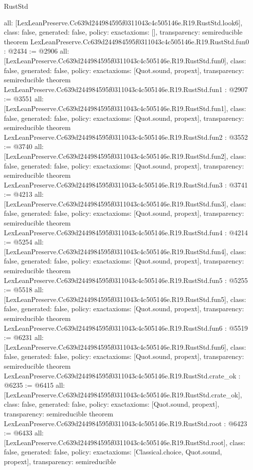 \begin{lexlean}{RustStd}
\begin{coremodule}
{  all: [LexLeanPreserve.Cc639d244984595f0311043c4c505146e.R19.RustStd.look6],
  class: false,
  generated: false,
  policy: exact{axioms: []},
  transparency: semireducible
}
theorem LexLeanPreserve.Cc639d244984595f0311043c4c505146e.R19.RustStd.fun0 : @2434 := @2906 {
  all: [LexLeanPreserve.Cc639d244984595f0311043c4c505146e.R19.RustStd.fun0],
  class: false,
  generated: false,
  policy: exact{axioms: [Quot.sound, propext]},
  transparency: semireducible
}
theorem LexLeanPreserve.Cc639d244984595f0311043c4c505146e.R19.RustStd.fun1 : @2907 := @3551 {
  all: [LexLeanPreserve.Cc639d244984595f0311043c4c505146e.R19.RustStd.fun1],
  class: false,
  generated: false,
  policy: exact{axioms: [Quot.sound, propext]},
  transparency: semireducible
}
theorem LexLeanPreserve.Cc639d244984595f0311043c4c505146e.R19.RustStd.fun2 : @3552 := @3740 {
  all: [LexLeanPreserve.Cc639d244984595f0311043c4c505146e.R19.RustStd.fun2],
  class: false,
  generated: false,
  policy: exact{axioms: [Quot.sound, propext]},
  transparency: semireducible
}
theorem LexLeanPreserve.Cc639d244984595f0311043c4c505146e.R19.RustStd.fun3 : @3741 := @4213 {
  all: [LexLeanPreserve.Cc639d244984595f0311043c4c505146e.R19.RustStd.fun3],
  class: false,
  generated: false,
  policy: exact{axioms: [Quot.sound, propext]},
  transparency: semireducible
}
theorem LexLeanPreserve.Cc639d244984595f0311043c4c505146e.R19.RustStd.fun4 : @4214 := @5254 {
  all: [LexLeanPreserve.Cc639d244984595f0311043c4c505146e.R19.RustStd.fun4],
  class: false,
  generated: false,
  policy: exact{axioms: [Quot.sound, propext]},
  transparency: semireducible
}
theorem LexLeanPreserve.Cc639d244984595f0311043c4c505146e.R19.RustStd.fun5 : @5255 := @5518 {
  all: [LexLeanPreserve.Cc639d244984595f0311043c4c505146e.R19.RustStd.fun5],
  class: false,
  generated: false,
  policy: exact{axioms: [Quot.sound, propext]},
  transparency: semireducible
}
theorem LexLeanPreserve.Cc639d244984595f0311043c4c505146e.R19.RustStd.fun6 : @5519 := @6231 {
  all: [LexLeanPreserve.Cc639d244984595f0311043c4c505146e.R19.RustStd.fun6],
  class: false,
  generated: false,
  policy: exact{axioms: [Quot.sound, propext]},
  transparency: semireducible
}
theorem LexLeanPreserve.Cc639d244984595f0311043c4c505146e.R19.RustStd.crate_ok : @6235 := @6415 {
  all: [LexLeanPreserve.Cc639d244984595f0311043c4c505146e.R19.RustStd.crate_ok],
  class: false,
  generated: false,
  policy: exact{axioms: [Quot.sound, propext]},
  transparency: semireducible
}
theorem LexLeanPreserve.Cc639d244984595f0311043c4c505146e.R19.RustStd.root : @6423 := @6433 {
  all: [LexLeanPreserve.Cc639d244984595f0311043c4c505146e.R19.RustStd.root],
  class: false,
  generated: false,
  policy: exact{axioms: [Classical.choice, Quot.sound, propext]},
  transparency: semireducible
}


\end{coremodule}
\end{lexlean}
